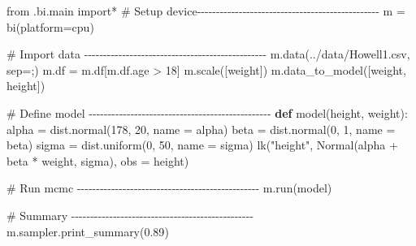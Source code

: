 \documentclass[
  letterpaper,
  DIV=11,
  numbers=noendperiod]{scrreprt}
\newenvironment{Shaded}{\begin{snugshade}}{\end{snugshade}}
\newcommand{\CommentTok}[1]{\textcolor[rgb]{0.37,0.37,0.37}{#1}}
\newcommand{\DecValTok}[1]{\textcolor[rgb]{0.68,0.00,0.00}{#1}}
\newcommand{\FloatTok}[1]{\textcolor[rgb]{0.68,0.00,0.00}{#1}}
\newcommand{\ImportTok}[1]{\textcolor[rgb]{0.00,0.46,0.62}{#1}}
\newcommand{\KeywordTok}[1]{\textcolor[rgb]{0.00,0.23,0.31}{\textbf{#1}}}
\newcommand{\NormalTok}[1]{\textcolor[rgb]{0.00,0.23,0.31}{#1}}
\newcommand{\OperatorTok}[1]{\textcolor[rgb]{0.37,0.37,0.37}{#1}}
\newcommand{\StringTok}[1]{\textcolor[rgb]{0.13,0.47,0.30}{#1}}
\begin{document}
\begin{Shaded}
\begin{Highlighting}[]
\ImportTok{from}\NormalTok{ .bi.main }\ImportTok{import}\OperatorTok{*}
\CommentTok{\# Setup device{-}{-}{-}{-}{-}{-}{-}{-}{-}{-}{-}{-}{-}{-}{-}{-}{-}{-}{-}{-}{-}{-}{-}{-}{-}{-}{-}{-}{-}{-}{-}{-}{-}{-}{-}{-}{-}{-}{-}{-}{-}{-}{-}{-}{-}{-}{-}{-}}
\NormalTok{m }\OperatorTok{=}\NormalTok{ bi(platform}\OperatorTok{=}\StringTok{\textquotesingle{}cpu\textquotesingle{}}\NormalTok{)}

\CommentTok{\# Import data {-}{-}{-}{-}{-}{-}{-}{-}{-}{-}{-}{-}{-}{-}{-}{-}{-}{-}{-}{-}{-}{-}{-}{-}{-}{-}{-}{-}{-}{-}{-}{-}{-}{-}{-}{-}{-}{-}{-}{-}{-}{-}{-}{-}{-}{-}{-}{-}}
\NormalTok{m.data(}\StringTok{\textquotesingle{}../data/Howell1.csv\textquotesingle{}}\NormalTok{, sep}\OperatorTok{=}\StringTok{\textquotesingle{};\textquotesingle{}}\NormalTok{) }
\NormalTok{m.df }\OperatorTok{=}\NormalTok{ m.df[m.df.age }\OperatorTok{\textgreater{}} \DecValTok{18}\NormalTok{]}
\NormalTok{m.scale([}\StringTok{\textquotesingle{}weight\textquotesingle{}}\NormalTok{])}
\NormalTok{m.data\_to\_model([}\StringTok{\textquotesingle{}weight\textquotesingle{}}\NormalTok{, }\StringTok{\textquotesingle{}height\textquotesingle{}}\NormalTok{])}

\CommentTok{\# Define model {-}{-}{-}{-}{-}{-}{-}{-}{-}{-}{-}{-}{-}{-}{-}{-}{-}{-}{-}{-}{-}{-}{-}{-}{-}{-}{-}{-}{-}{-}{-}{-}{-}{-}{-}{-}{-}{-}{-}{-}{-}{-}{-}{-}{-}{-}{-}{-}}
\KeywordTok{def}\NormalTok{ model(height, weight):    }
\NormalTok{    alpha }\OperatorTok{=}\NormalTok{ dist.normal(}\DecValTok{178}\NormalTok{, }\DecValTok{20}\NormalTok{, name }\OperatorTok{=} \StringTok{\textquotesingle{}alpha\textquotesingle{}}\NormalTok{)}
\NormalTok{    beta }\OperatorTok{=}\NormalTok{ dist.normal(}\DecValTok{0}\NormalTok{, }\DecValTok{1}\NormalTok{, name }\OperatorTok{=} \StringTok{\textquotesingle{}beta\textquotesingle{}}\NormalTok{)   }
\NormalTok{    sigma }\OperatorTok{=}\NormalTok{ dist.uniform(}\DecValTok{0}\NormalTok{, }\DecValTok{50}\NormalTok{, name }\OperatorTok{=} \StringTok{\textquotesingle{}sigma\textquotesingle{}}\NormalTok{)}
\NormalTok{    lk(}\StringTok{"height"}\NormalTok{, Normal(alpha }\OperatorTok{+}\NormalTok{ beta }\OperatorTok{*}\NormalTok{ weight, sigma), obs }\OperatorTok{=}\NormalTok{ height)}

\CommentTok{\# Run mcmc {-}{-}{-}{-}{-}{-}{-}{-}{-}{-}{-}{-}{-}{-}{-}{-}{-}{-}{-}{-}{-}{-}{-}{-}{-}{-}{-}{-}{-}{-}{-}{-}{-}{-}{-}{-}{-}{-}{-}{-}{-}{-}{-}{-}{-}{-}{-}{-}}
\NormalTok{m.run(model) }

\CommentTok{\# Summary {-}{-}{-}{-}{-}{-}{-}{-}{-}{-}{-}{-}{-}{-}{-}{-}{-}{-}{-}{-}{-}{-}{-}{-}{-}{-}{-}{-}{-}{-}{-}{-}{-}{-}{-}{-}{-}{-}{-}{-}{-}{-}{-}{-}{-}{-}{-}{-}}
\NormalTok{m.sampler.print\_summary(}\FloatTok{0.89}\NormalTok{)}
\end{Highlighting}
\end{Shaded}
\end{document}
